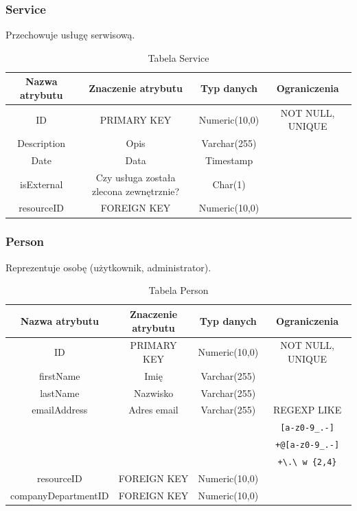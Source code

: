 \subsubsection{Service}
Przechowuje usługę serwisową.
\begin{table}[H]
	\renewcommand\arraystretch{1.5}
	\renewcommand\tabcolsep{1pt}
	\begin{tabular}{| c | c | c | c |} 
	\hline \textbf{Nazwa atrybutu} & \textbf{Znaczenie atrybutu} & \textbf{Typ danych} & \textbf{Ograniczenia} \\ 
	\hline ID & PRIMARY KEY & Numeric(10,0) & NOT NULL, UNIQUE \\ 
	\hline Description & Opis & Varchar(255) & \\ 
	\hline Date & Data & Timestamp &  \\ 
	\hline isExternal & Czy usługa została zlecona zewnętrznie? & Char(1) & \\ 
	\hline resourceID & FOREIGN KEY & Numeric(10,0) & \\ 
	\hline 
\end{tabular}
\caption{Tabela Service}
\label{TAB:Service}
\end{table} 

\subsubsection{Person}
Reprezentuje osobę (użytkownik, administrator).
\begin{table}[H]
	\renewcommand\arraystretch{1.5}
	\renewcommand\tabcolsep{3pt}
\begin{tabular}{| c | c | c | c |}
	\hline \textbf{Nazwa atrybutu} & \textbf{Znaczenie atrybutu} & \textbf{Typ danych} & \textbf{Ograniczenia} \\ 
	\hline ID & PRIMARY KEY & Numeric(10,0) & NOT NULL, UNIQUE \\ 
	\hline firstName & Imię & Varchar(255) & \\ 
	\hline lastName & Nazwisko & Varchar(255) &  \\ 
	\hline emailAddress & Adres email & Varchar(255) & REGEXP LIKE\\
	~ & ~ & ~ & \verb|[a-z0-9_.-]|\\ 
	~ & ~ & ~ & \verb|+@[a-z0-9_.-]|\\ 
	~ & ~ & ~ & \verb|+\.\ w {2,4}|\\ 
	\hline resourceID & FOREIGN KEY & Numeric(10,0) & \\ 
	\hline companyDepartmentID & FOREIGN KEY & Numeric(10,0) & \\ 
	\hline 
\end{tabular} 
\caption{Tabela Person}
\label{TAB:Person}
\end{table}


